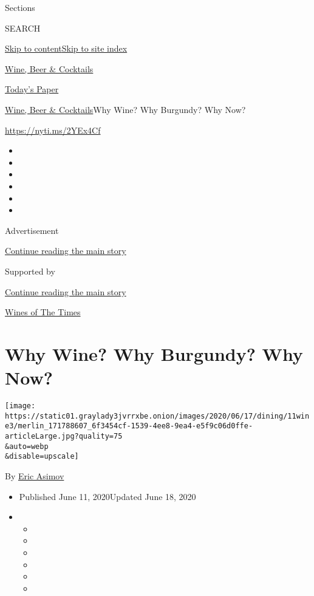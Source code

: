 Sections

SEARCH

\protect\hyperlink{site-content}{Skip to
content}\protect\hyperlink{site-index}{Skip to site index}

\href{https://www.nytimes3xbfgragh.onion/section/food/drinks}{Wine, Beer
\& Cocktails}

\href{https://myaccount.nytimes3xbfgragh.onion/auth/login?response_type=cookie\&client_id=vi}{}

\href{https://www.nytimes3xbfgragh.onion/section/todayspaper}{Today's
Paper}

\href{/section/food/drinks}{Wine, Beer \& Cocktails}\textbar{}Why Wine?
Why Burgundy? Why Now?

\url{https://nyti.ms/2YEx4Cf}

\begin{itemize}
\item
\item
\item
\item
\item
\item
\end{itemize}

Advertisement

\protect\hyperlink{after-top}{Continue reading the main story}

Supported by

\protect\hyperlink{after-sponsor}{Continue reading the main story}

\href{/column/wines-of-the-times}{Wines of The Times}

\hypertarget{why-wine-why-burgundy-why-now}{%
\section{Why Wine? Why Burgundy? Why
Now?}\label{why-wine-why-burgundy-why-now}}

\texttt{[image: https://static01.graylady3jvrrxbe.onion/images/2020/06/17/dining/11wine3/merlin\_171788607\_6f3454cf-1539-4ee8-9ea4-e5f9c06d0ffe-articleLarge.jpg?quality=75\\\&auto=webp\\\&disable=upscale]}

By \href{https://www.nytimes3xbfgragh.onion/by/eric-asimov}{Eric Asimov}

\begin{itemize}
\item
  Published June 11, 2020Updated June 18, 2020
\item
  \begin{itemize}
  \item
  \item
  \item
  \item
  \item
  \item
  \end{itemize}
\end{itemize}

